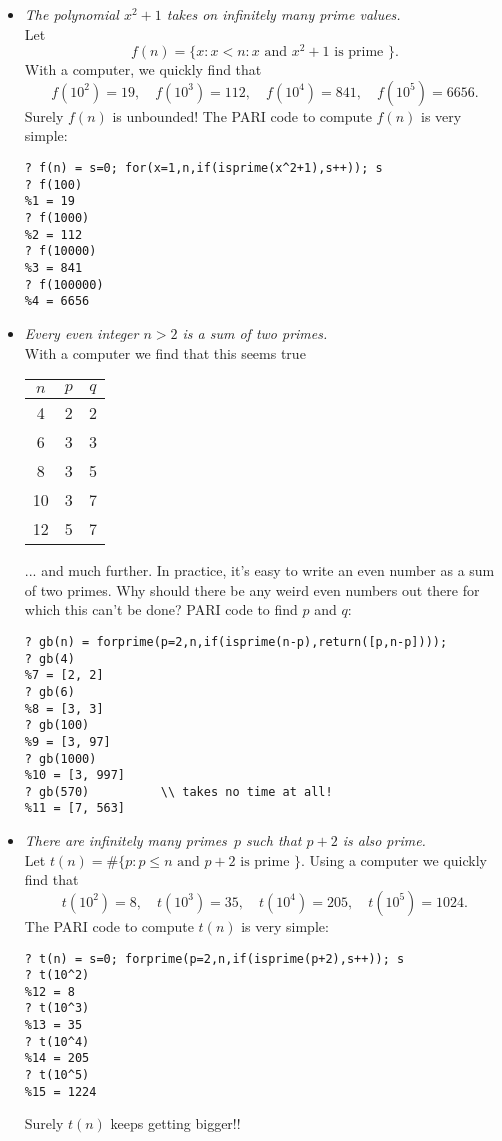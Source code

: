 \documentclass[11pt]{report}
\begin{document}
\begin{itemize}
  \item {\em The polynomial $x^2+1$ takes on infinitely many prime values.}\\
        Let
        $$f(n) = \{x : x < n : x \text{ and }x^2+1\text{ is prime }\}.$$
        With a computer, we quickly find that
        $$f(10^2) = 19, \quad f(10^3)=112, \quad f(10^4)=841,
          \quad f(10^5) = 6656.$$
        Surely $f(n)$ is unbounded!
        The PARI code to compute $f(n)$ is very simple:
        \begin{verbatim}
? f(n) = s=0; for(x=1,n,if(isprime(x^2+1),s++)); s
? f(100)
%1 = 19
? f(1000)
%2 = 112
? f(10000)
%3 = 841
? f(100000)
%4 = 6656
\end{verbatim}

  \item {\em Every even integer $n>2$ is a sum of two primes.}\\
        With a computer we find that this seems true
        \begin{center}
          \begin{tabular}{c|cc}
            $n$ & $p$ & $q$ \\\hline
            4   & 2   & 2   \\
            6   & 3   & 3   \\
            8   & 3   & 5   \\
            10  & 3   & 7   \\
            12  & 5   & 7   \\\hline
          \end{tabular}
        \end{center}
        ... and much further.  In practice, it's easy to write
        an even number as a sum of two primes.  Why should there
        be any weird even numbers out there for which this can't be done?
        PARI code to find $p$ and $q$:
        \begin{verbatim}
? gb(n) = forprime(p=2,n,if(isprime(n-p),return([p,n-p])));
? gb(4)
%7 = [2, 2]
? gb(6)
%8 = [3, 3]
? gb(100)
%9 = [3, 97]
? gb(1000)
%10 = [3, 997]
? gb(570)          \\ takes no time at all!
%11 = [7, 563]
\end{verbatim}

  \item {\em There are infinitely many primes~$p$ such that $p+2$
        is also prime.}\\
        Let $t(n)=\#\{p : p \le n\text{ and } p+2 \text{ is prime }\}$.
        Using a computer we quickly find that
        $$t(10^2)=8, \quad t(10^3)=35,\quad t(10^4)=205, \quad t(10^5)=1024.$$
        The PARI code to compute $t(n)$ is very simple:
        \begin{verbatim}
? t(n) = s=0; forprime(p=2,n,if(isprime(p+2),s++)); s
? t(10^2)
%12 = 8
? t(10^3)
%13 = 35
? t(10^4)
%14 = 205
? t(10^5)
%15 = 1224
\end{verbatim}
        Surely $t(n)$ keeps getting bigger!!
\end{itemize}
\end{document}
